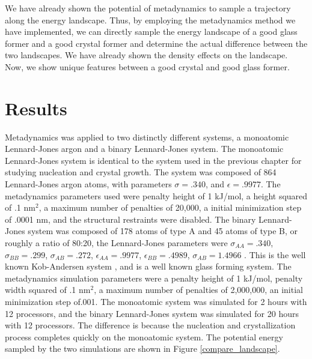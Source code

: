 We have already shown the potential of metadynamics to sample a trajectory along the energy landscape.  Thus, by employing the metadynamics method we have implemented, we can directly sample the energy landscape of a good glass former and a good crystal former and determine the actual difference between the two landscapes.  We have already shown the density effects on the landscape.  Now, we show unique features between a good crystal and good glass former.

\section{Results}
\label{kob_andersen}
Metadynamics was applied to two distinctly different systems, a monoatomic Lennard-Jones argon and a binary Lennard-Jones system.  The monoatomic Lennard-Jones system is identical to the system used in the previous chapter for studying nucleation and crystal growth.  The system was composed of 864 Lennard-Jones argon atoms, with parameters $\sigma = .340$, and $\epsilon = .9977$.  The metadynamics parameters used were penalty height of 1 kJ/mol, a height squared of .1 nm$^2$, a maximum number of penalties of 20,000, a initial minimization step of .0001 nm, and the structural restraints were disabled.  The binary Lennard-Jones system was composed of 178 atoms of type A and 45 atoms of type B, or roughly a ratio of 80:20, the Lennard-Jones parameters were $\sigma_{AA} = .340$, $\sigma_{BB} = .299$, $\sigma_{AB} = .272$, $\epsilon_{AA} = .9977$, $\epsilon_{BB} = .4989$, $\sigma_{AB} = 1.4966$ \cite{PhysRevE.51.4626}.  This is the well known Kob-Andersen system \cite{PhysRevE.51.4626}, and is a well known glass forming system.  The metadynamics simulation parameters were a penalty height of 1 kJ/mol, penalty width squared of .1 nm$^2$, a maximum number of penalties of 2,000,000, an initial minimization step of.001.  The monoatomic system was simulated for 2 hours with 12 processors, and the binary Lennard-Jones system was simulated for 20 hours with 12 processors.  The difference is because the nucleation and crystallization process completes quickly on the monoatomic system.  The potential energy sampled by the two simulations are shown in Figure \ref{compare_landscape}.


